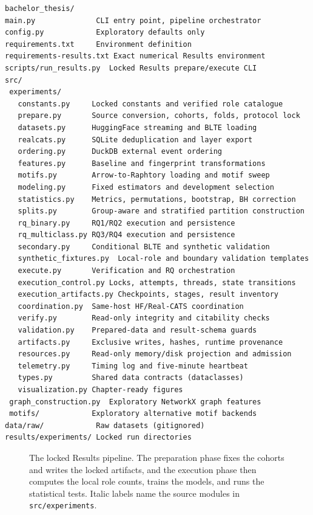 \begin{lstlisting}[caption={Project layout (abbreviated).},
  label={lst:layout}]
bachelor_thesis/
main.py              CLI entry point, pipeline orchestrator
config.py            Exploratory defaults only
requirements.txt     Environment definition
requirements-results.txt Exact numerical Results environment
scripts/run_results.py  Locked Results prepare/execute CLI
src/
 experiments/
   constants.py     Locked constants and verified role catalogue
   prepare.py       Source conversion, cohorts, folds, protocol lock
   datasets.py      HuggingFace streaming and BLTE loading
   realcats.py      SQLite deduplication and layer export
   ordering.py      DuckDB external event ordering
   features.py      Baseline and fingerprint transformations
   motifs.py        Arrow-to-Raphtory loading and motif sweep
   modeling.py      Fixed estimators and development selection
   statistics.py    Metrics, permutations, bootstrap, BH correction
   splits.py        Group-aware and stratified partition construction
   rq_binary.py     RQ1/RQ2 execution and persistence
   rq_multiclass.py RQ3/RQ4 execution and persistence
   secondary.py     Conditional BLTE and synthetic validation
   synthetic_fixtures.py  Local-role and boundary validation templates
   execute.py       Verification and RQ orchestration
   execution_control.py Locks, attempts, threads, state transitions
   execution_artifacts.py Checkpoints, stages, result inventory
   coordination.py  Same-host HF/Real-CATS coordination
   verify.py        Read-only integrity and citability checks
   validation.py    Prepared-data and result-schema guards
   artifacts.py     Exclusive writes, hashes, runtime provenance
   resources.py     Read-only memory/disk projection and admission
   telemetry.py     Timing log and five-minute heartbeat
   types.py         Shared data contracts (dataclasses)
   visualization.py Chapter-ready figures
 graph_construction.py  Exploratory NetworkX graph features
 motifs/            Exploratory alternative motif backends
data/raw/            Raw datasets (gitignored)
results/experiments/ Locked run directories
\end{lstlisting}

\begin{figure}[p]
  \centering
  \caption{The locked Results pipeline. The preparation phase fixes the cohorts
  and writes the locked artifacts, and the execution phase then computes the
  local role counts, trains the models, and runs the statistical tests. Italic labels name
  the source modules in \texttt{src/experiments}.}
  \label{fig:pipeline_architecture}
\end{figure}


